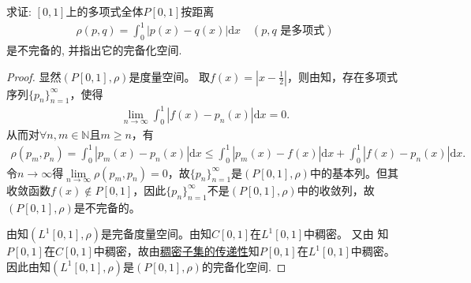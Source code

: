 \documentclass[../../main.tex]{subfiles}%
\begin{document}
\begin{example}
求证: $[0,1]$上的多项式全体$P[0,1]$按距离
\begin{align*}
\rho(p,q)=\int_{0}^{1}|p(x)-q(x)|\mathrm{d}x \quad (p,q\text{ 是多项式})
\end{align*}
是不完备的, 并指出它的完备化空间.
\end{example}
\begin{proof}
显然$(P[0,1],\rho)$是度量空间。
取$f(x)=\left|x-\frac{1}{2}\right|$，则由知，存在多项式序列$\{p_n\}_{n=1}^{\infty}$，使得
\begin{align*}
\lim\limits_{n\rightarrow \infty}\int_0^1\left|f(x)-p_n(x)\right|\mathrm{d}x=0.
\end{align*}
从而对$\forall n,m\in\mathbb{N}$且$m\geqslant n$，有
\begin{align*}
\rho (p_m,p_n)=\int_0^1{\left| p_m\left( x \right) -p_n\left( x \right) \right|\mathrm{d}x}\leqslant \int_0^1{\left| p_m\left( x \right) -f\left( x \right) \right|\mathrm{d}x}+\int_0^1{\left| f\left( x \right) -p_n\left( x \right) \right|\mathrm{d}x}.
\end{align*}
令$n\rightarrow \infty$得$\lim\limits_{n\rightarrow \infty}\rho(p_m,p_n)=0$，故$\{p_n\}_{n=1}^{\infty}$是$(P[0,1],\rho)$中的基本列。但其收敛函数$f(x)\notin P[0,1]$，因此$\{p_n\}_{n=1}^{\infty}$不是$(P[0,1],\rho)$中的收敛列，故$(P[0,1],\rho)$是不完备的。

由知$(L^1[0,1],\rho)$是完备度量空间。由知$C[0,1]$在$L^1[0,1]$中稠密。
又由
知$P[0,1]$在$C[0,1]$中稠密，故由\hyperref[proposition:稠密子集的传递性]{稠密子集的传递性}知$P[0,1]$在$L^1[0,1]$中稠密。
因此由知$(L^1[0,1],\rho)$是$(P[0,1],\rho)$的完备化空间.
\end{proof}
\end{document}
